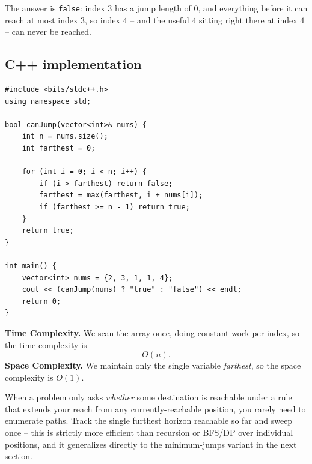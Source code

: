 The answer is \texttt{false}: index $3$ has a jump length of $0$, and
everything before it can reach at most index $3$, so index $4$ -- and the
useful $4$ sitting right there at index $4$ -- can never be reached.

\subsection*{C++ implementation}

\begin{lstlisting}
#include <bits/stdc++.h>
using namespace std;

bool canJump(vector<int>& nums) {
    int n = nums.size();
    int farthest = 0;

    for (int i = 0; i < n; i++) {
        if (i > farthest) return false;
        farthest = max(farthest, i + nums[i]);
        if (farthest >= n - 1) return true;
    }
    return true;
}

int main() {
    vector<int> nums = {2, 3, 1, 1, 4};
    cout << (canJump(nums) ? "true" : "false") << endl;
    return 0;
}
\end{lstlisting}

\begin{complexitybox}
\textbf{Time Complexity.} We scan the array once, doing constant work per
index, so the time complexity is
\[
  O(n).
\]
\textbf{Space Complexity.} We maintain only the single variable
\textit{farthest}, so the space complexity is $O(1)$.
\end{complexitybox}

\begin{takeawaybox}
When a problem only asks \emph{whether} some destination is reachable under
a rule that extends your reach from any currently-reachable position, you
rarely need to enumerate paths. Track the single furthest horizon reachable
so far and sweep once -- this is strictly more efficient than recursion or
BFS/DP over individual positions, and it generalizes directly to the
minimum-jumps variant in the next section.
\end{takeawaybox}
